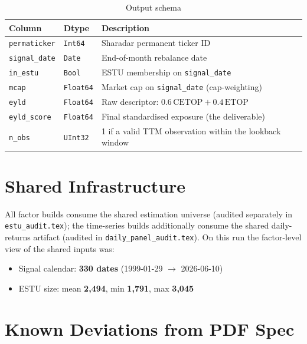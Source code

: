 \documentclass[11pt,a4paper]{article}
\begin{document}
\begin{table}[h!]
\centering
\caption{Output schema}
\begin{tabular}{llp{7.4cm}}
\toprule
\textbf{Column} & \textbf{Dtype} & \textbf{Description} \\
\midrule
\texttt{permaticker} & \texttt{Int64} & Sharadar permanent ticker ID \\
\texttt{signal\_date} & \texttt{Date} & End-of-month rebalance date \\
\texttt{in\_estu} & \texttt{Bool} & ESTU membership on \texttt{signal\_date} \\
\texttt{mcap} & \texttt{Float64} & Market cap on \texttt{signal\_date} (cap-weighting) \\
\texttt{eyld} & \texttt{Float64} & Raw descriptor: $0.6\,\mathrm{CETOP} + 0.4\,\mathrm{ETOP}$ \\
\texttt{eyld\_score} & \texttt{Float64} & Final standardised exposure (the deliverable) \\
\texttt{n\_obs} & \texttt{UInt32} & 1 if a valid TTM observation within the lookback window \\
\bottomrule
\end{tabular}
\end{table}

\section{Shared Infrastructure}

All factor builds consume the shared estimation universe
 (audited separately in
\texttt{estu\_audit.tex}); the time-series builds additionally consume the
shared daily-returns artifact (audited in \texttt{daily\_panel\_audit.tex}).
On this run the factor-level view of the shared inputs was:

\begin{itemize}[leftmargin=*,topsep=2pt,itemsep=2pt]
  \item Signal calendar: \textbf{330 dates} (1999-01-29 $\to$ 2026-06-10)
  \item ESTU size: mean \textbf{2{,}494}, min \textbf{1{,}791}, max \textbf{3{,}045}
\end{itemize}

\section{Known Deviations from PDF Spec}
\end{document}
